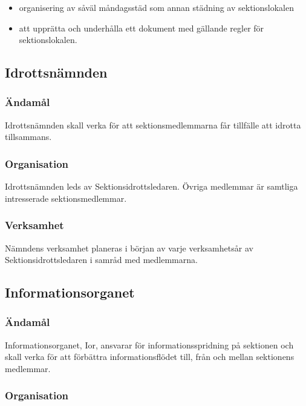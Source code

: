 \documentclass{dgovdoc}
\begin{document}
\begin{itemize}
  \item organisering av såväl måndagsstäd som annan städning av
sektionslokalen
\end{itemize}

\begin{itemize}
  \item att upprätta och underhålla ett dokument med gällande regler för
    sektionslokalen.
\end{itemize}


\subsection{Idrottsnämnden}

\subsubsection{Ändamål}

Idrottsnämnden skall verka för att sektionsmedlemmarna får tillfälle att
idrotta tillsammans.

\subsubsection{Organisation}

Idrottsnämnden leds av Sektionsidrottsledaren. Övriga medlemmar är samtliga
intresserade sektionsmedlemmar.

\subsubsection{Verksamhet}

Nämndens verksamhet planeras i början av varje verksamhetsår av
Sektionsidrottsledaren i samråd med medlemmarna.

\subsection{Informationsorganet}

\subsubsection{Ändamål}

Informationsorganet, Ior, ansvarar för informationsspridning på sektionen och
skall verka för att förbättra informationsflödet till, från och mellan
sektionens medlemmar.

\subsubsection{Organisation}
\end{document}

